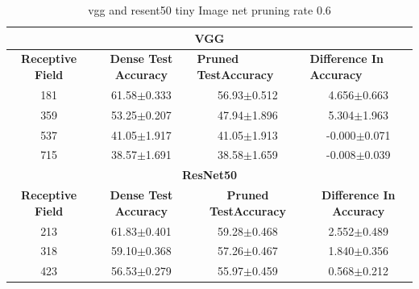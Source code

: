 \begin{table}[]
\begin{tabular}{@{}cccc@{}}
\toprule
\multicolumn{4}{c}{\textbf{VGG}}                                                                                                                                  \\ \midrule
\textbf{Receptive Field} & \textbf{Dense Test Accuracy} & \multicolumn{1}{l}{\textbf{Pruned  TestAccuracy}} & \multicolumn{1}{l}{\textbf{Difference In Accuracy}} \\ \midrule
181                      & 61.58$\pm$0.333              & 56.93$\pm$0.512                                   & 4.656$\pm$0.663                                     \\
359                      & 53.25$\pm$0.207              & 47.94$\pm$1.896                                   & 5.304$\pm$1.963                                     \\
537                      & 41.05$\pm$1.917              & 41.05$\pm$1.913                                   & -0.000$\pm$0.071                                    \\
715                      & 38.57$\pm$1.691              & 38.58$\pm$1.659                                   & -0.008$\pm$0.039                                    \\ \midrule
\multicolumn{4}{c}{\textbf{ResNet50}}                                                                                                                             \\ \midrule
\textbf{Receptive Field} & \textbf{Dense Test Accuracy} & \textbf{Pruned  TestAccuracy}                     & \textbf{Difference In Accuracy}                     \\
213                      & 61.83$\pm$0.401              & 59.28$\pm$0.468                                   & 2.552$\pm$0.489                                     \\
318                      & 59.10$\pm$0.368              & 57.26$\pm$0.467                                   & 1.840$\pm$0.356                                     \\
423                      & 56.53$\pm$0.279              & 55.97$\pm$0.459                                   & 0.568$\pm$0.212                                     \\ \bottomrule
\end{tabular}
\caption{vgg and resent50 tiny Image net pruning rate 0.6}
\label{tab:tiny imagenet pruning rate06}
\end{table}




